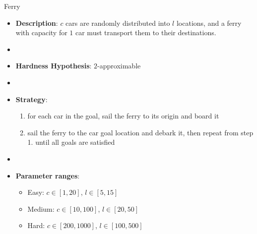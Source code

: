 \documentclass[aspectratio=169,xcolor=dvipsnames]{beamer}
\begin{document}
\begin{frame}{Ferry}

    \begin{itemize}
        \item \textbf{Description}: $c$ cars are randomly distributed into $l$ locations, and a ferry with capacity for $1$ car must transport them to their destinations.
        \item[]
        \item \textbf{Hardness Hypothesis}: $2$-approximable %
        \item[]
        \item \textbf{Strategy}:
        \begin{enumerate}
            \item for each car in the goal, sail the ferry to its origin and board it
            \item sail the ferry to the car goal location and debark it, then repeat from step 1. until all goals are satisfied
        \end{enumerate}
        \item[]
        \item \textbf{Parameter ranges}:
        \begin{itemize}
            \item Easy: $c\in[1, 20]$, $l \in [5, 15]$
            \item Medium: $c\in[10, 100]$, $l \in [20, 50]$
            \item Hard: $c\in[200, 1000]$, $l \in [100, 500]$
        \end{itemize}
    \end{itemize}

\end{frame}
\end{document}
